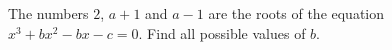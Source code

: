 The numbers $2$, $a+1$ and $a-1$ are the roots of the equation $x^3+bx^2-bx-c=0$. Find all possible values of $b$.
